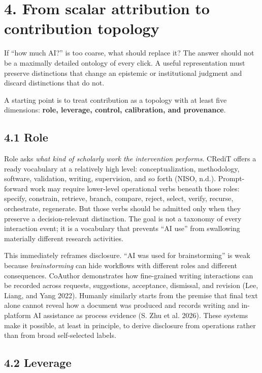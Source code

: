 \documentclass[
]{article}
\begin{document}
\section{4. From scalar attribution to contribution
topology}\label{from-scalar-attribution-to-contribution-topology}

If ``how much AI?'' is too coarse, what should replace it? The answer
should not be a maximally detailed ontology of every click. A useful
representation must preserve distinctions that change an epistemic or
institutional judgment and discard distinctions that do not.

A starting point is to treat contribution as a topology with at least
five dimensions: \textbf{role, leverage, control, calibration, and
provenance}.

\subsection{4.1 Role}\label{role}

Role asks \emph{what kind of scholarly work the intervention performs}.
CRediT offers a ready vocabulary at a relatively high level:
conceptualization, methodology, software, validation, writing,
supervision, and so forth (NISO, n.d.). Prompt-forward work may require
lower-level operational verbs beneath those roles: specify, constrain,
retrieve, branch, compare, reject, select, verify, recurse, orchestrate,
regenerate. But those verbs should be admitted only when they preserve a
decision-relevant distinction. The goal is not a taxonomy of every
interaction event; it is a vocabulary that prevents ``AI use'' from
swallowing materially different research activities.

This immediately reframes disclosure. ``AI was used for brainstorming''
is weak because \emph{brainstorming} can hide workflows with different
roles and different consequences. CoAuthor demonstrates how fine-grained
writing interactions can be recorded across requests, suggestions,
acceptance, dismissal, and revision (Lee, Liang, and Yang 2022). Humanly
similarly starts from the premise that final text alone cannot reveal
how a document was produced and records writing and in-platform AI
assistance as process evidence (S. Zhu et al. 2026). These systems make
it possible, at least in principle, to derive disclosure from operations
rather than from broad self-selected labels.

\subsection{4.2 Leverage}\label{leverage}
\end{document}
